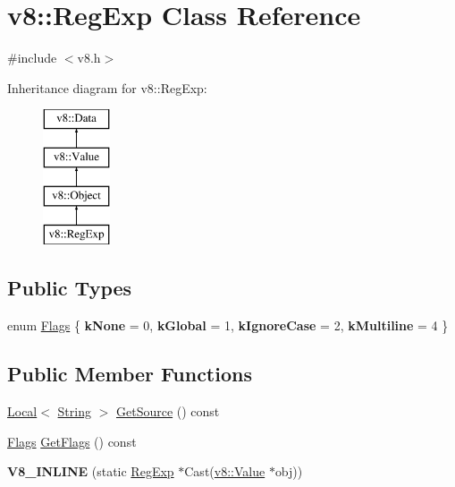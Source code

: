 \hypertarget{classv8_1_1_reg_exp}{}\section{v8\+:\+:Reg\+Exp Class Reference}
\label{classv8_1_1_reg_exp}


{\ttfamily \#include $<$v8.\+h$>$}

Inheritance diagram for v8\+:\+:Reg\+Exp\+:\begin{figure}[H]
\begin{center}
\leavevmode
\includegraphics[height=4.000000cm]{classv8_1_1_reg_exp}
\end{center}
\end{figure}
\subsection*{Public Types}
\begin{DoxyCompactItemize}
\item 
enum \hyperlink{classv8_1_1_reg_exp_aa4718a5c1f18472aff3bf51ed694fc5a}{Flags} \{ {\bfseries k\+None} = 0, 
{\bfseries k\+Global} = 1, 
{\bfseries k\+Ignore\+Case} = 2, 
{\bfseries k\+Multiline} = 4
 \}
\end{DoxyCompactItemize}
\subsection*{Public Member Functions}
\begin{DoxyCompactItemize}
\item 
\hyperlink{classv8_1_1_local}{Local}$<$ \hyperlink{classv8_1_1_string}{String} $>$ \hyperlink{classv8_1_1_reg_exp_a448213f2a92d964ed260b51429d5e590}{Get\+Source} () const 
\item 
\hyperlink{classv8_1_1_reg_exp_aa4718a5c1f18472aff3bf51ed694fc5a}{Flags} \hyperlink{classv8_1_1_reg_exp_ad5a5e77e6e626b3c7c69eef7ba2908cc}{Get\+Flags} () const 
\item 
\hypertarget{classv8_1_1_reg_exp_ad65e1ae3851100b0590b47145000976a}{}{\bfseries V8\+\_\+\+I\+N\+L\+I\+N\+E} (static \hyperlink{classv8_1_1_reg_exp}{Reg\+Exp} $\ast$Cast(\hyperlink{classv8_1_1_value}{v8\+::\+Value} $\ast$obj))\label{classv8_1_1_reg_exp_ad65e1ae3851100b0590b47145000976a}

\end{DoxyCompactItemize}

